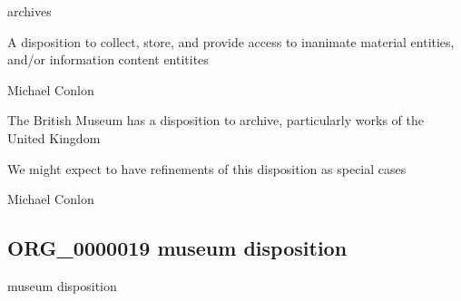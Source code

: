 \documentclass[letterpaper,10pt,english]{sphinxmanual}
\begin{document}
\begin{sphinxShadowBox}

\sphinxAtStartPar
archives
\end{sphinxShadowBox}

\begin{sphinxShadowBox}

\sphinxAtStartPar
A disposition to collect, store, and provide access to inanimate material entities, and/or information content entitites
\end{sphinxShadowBox}

\begin{sphinxShadowBox}

\sphinxAtStartPar
Michael Conlon 
\end{sphinxShadowBox}

\begin{sphinxShadowBox}

\sphinxAtStartPar
The British Museum has a disposition to archive, particularly works of the United Kingdom
\end{sphinxShadowBox}

\begin{sphinxShadowBox}

\sphinxAtStartPar
We might expect to have refinements of this disposition as special cases
\end{sphinxShadowBox}

\begin{sphinxShadowBox}

\sphinxAtStartPar
Michael Conlon 
\end{sphinxShadowBox}
\begin{quote}

\ignorespaces \end{quote}


\subsection{ORG\_0000019 \sphinxhyphen{} museum disposition}
\label{\detokenize{doc-ORG_0000019:org-0000019-museum-disposition}}\label{\detokenize{doc-ORG_0000019:index-0}}\label{\detokenize{doc-ORG_0000019::doc}}
\begin{sphinxShadowBox}

\sphinxAtStartPar
museum disposition
\end{sphinxShadowBox}
\end{document}
